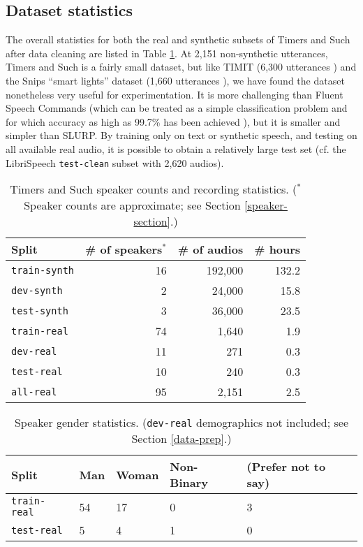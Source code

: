 \documentclass{article}
\begin{document}
\subsection{Dataset statistics}\label{statistics}
The overall statistics for both the real and synthetic subsets of Timers and Such after data cleaning are listed in Table \ref{stats-counts}. At 2,151 non-synthetic utterances, Timers and Such is a fairly small dataset, but like TIMIT (6,300 utterances \cite{timit}) and the Snips ``smart lights'' dataset (1,660 utterances \cite{saade2018spoken}), we have found the dataset nonetheless very useful for experimentation. It is more challenging than Fluent Speech Commands (which can be treated as a simple classification problem and for which accuracy as high as 99.7\% has been achieved \cite{seo2021integration}), but it is smaller and simpler than SLURP. By training only on text or synthetic speech, and testing on all available real audio, it is possible to obtain a relatively large test set (cf. the LibriSpeech \texttt{test-clean} subset with 2,620 audios).

\begin{table}[ht]
  \caption{Timers and Such speaker counts and recording statistics. ($^*$Speaker counts are approximate; see Section \ref{speaker-section}.)}
  \centering
  \begin{tabular}{l r r r}
    \toprule
    Split & \# of speakers$^*$ & \# of audios & \# hours\\
    \midrule
    \texttt{train-synth} & 16 &  192,000  & 132.2  \\
    \texttt{dev-synth}  & 2 &   24,000  &  15.8  \\
    \texttt{test-synth}  & 3 & 36,000   &  23.5 \\
    \midrule
    \texttt{train-real} & 74 &  1,640  & 1.9  \\
    \texttt{dev-real}  & 11 &   271  &  0.3  \\
    \texttt{test-real}  & 10 & 240   &  0.3 \\
    \midrule
    \texttt{all-real} & 95 & 2,151   &  2.5 \\
    \bottomrule
  \end{tabular}\label{stats-counts}
  
\end{table}

\begin{table}[ht]
  \caption{Speaker gender statistics. (\texttt{dev-real} demographics not included; see Section \ref{data-prep}.)}
  \label{tab:stats}
  \centering
  \begin{tabular}{p{20mm}p{10mm}p{10mm}p{10mm}p{15mm}}
    \toprule
    Split & Man & Woman & Non-Binary &
        (Prefer not to say)\\
    \midrule
    \texttt{train-real} & 54 &  17  & 0 & 3 \\
    \texttt{test-real}  & 5 & 4   &  1 & 0 \\
    \bottomrule
  \end{tabular}\label{stats-gender}
  
\end{table}
\end{document}
